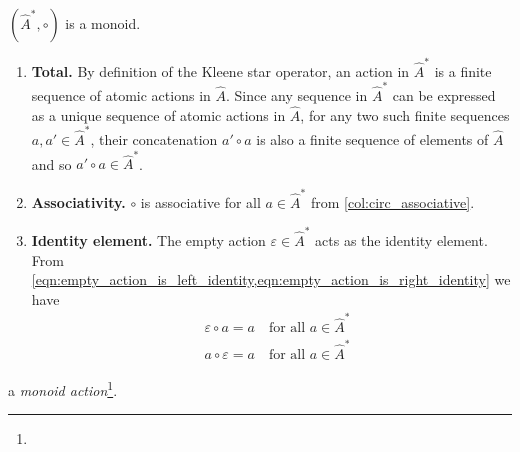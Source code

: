 \begin{propositionE}
    $(\hat{A}^{*}, \circ)$ is a monoid.
\end{propositionE}
\begin{proofE}
\begin{enumerate}
    \item \textbf{Total.}
    By definition of the Kleene star operator, an action in $\hat{A}^{*}$ is a finite sequence of atomic actions in $\hat{A}$.
    Since any sequence in $\hat{A}^{*}$ can be expressed as a unique sequence of atomic actions in $\hat{A}$, for any two such finite sequences $a, a' \in \hat{A}^{*}$, their concatenation $a' \circ a$ is also a finite sequence of elements of $\hat{A}$ and so $a' \circ a \in \hat{A}^{*}$.
    
    \item \textbf{Associativity.}
    $\circ$ is associative for all $a \in \hat{A}^{*}$ from \cref{col:circ_associative}.

    \item \textbf{Identity element.}
    The empty action $\varepsilon \in \hat{A}^{*}$ acts as the identity element.
    From \cref{eqn:empty_action_is_left_identity,eqn:empty_action_is_right_identity} we have
    \begin{align}
        & \varepsilon \circ a = a \quad \text{for all $a \in \hat{A}^{*}$} \\
        & a \circ \varepsilon = a \quad \text{for all $a \in \hat{A}^{*}$}
    \end{align}
\end{enumerate}
\end{proofE}


 a \emph{monoid action}\footnote{
}.


